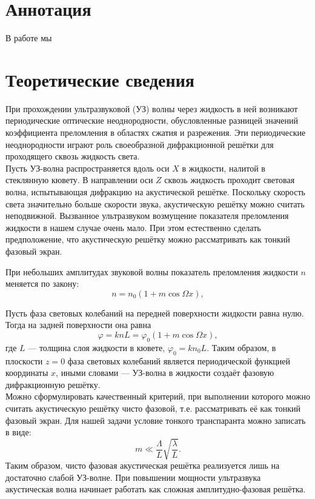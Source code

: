 \section*{Аннотация}
В работе мы 
\section*{Теоретические сведения}

\indent При прохождении ультразвуковой (УЗ) волны через жидкость в ней возникают периодические оптические неоднородности, обусловленные разницей значений коэффициента преломления в областях сжатия и разрежения. Эти периодические неоднородности играют роль своеобразной дифракционной решётки для проходящего сквозь жидкость света.\\

\indent
Пусть УЗ-волна распространяется вдоль оси $X$ в жидкости, налитой в стеклянную кювету. В направлении оси $Z$ сквозь жидкость проходит световая волна, испытывающая дифракцию на акустической решётке. Поскольку скорость света значительно больше скорости звука, акустическую решётку можно считать неподвижной. Вызванное ультразвуком возмущение показателя преломления жидкости в нашем случае очень мало. При этом естественно сделать предположение, что акустическую решётку можно рассматривать как тонкий фазовый экран.

При небольших амплитудах звуковой волны показатель преломления жидкости $n$ меняется по закону:
\begin{equation}
n = n_0(1 + m \cos\Omega x),
\end{equation}

\indent
Пусть фаза световых колебаний на передней поверхности жидкости равна нулю. Тогда на задней поверхности она равна
$$
\varphi = knL = \varphi_0(1 + m\cos\Omega x),
$$
где $L$ — толщина слоя жидкости в кювете, $\varphi_0=kn_0L$. Таким образом, в плоскости $z=0$ фаза световых колебаний является периодической функцией координаты $x$, иными словами — УЗ-волна в жидкости создаёт фазовую дифракционную решётку.\\

\indent
Можно сформулировать качественный критерий, при выполнении которого можно считать акустическую решётку чисто фазовой, т.е. рассматривать её как тонкий фазовый экран. Для нашей задачи условие тонкого транспаранта можно записать в виде:
$$
m \ll \frac{\Lambda}{L} \sqrt{\frac{\lambda}{L}}.
$$
\indent
Таким образом, чисто фазовая акустическая решётка реализуется лишь на достаточно слабой УЗ-волне. При повышении мощности ультразвука акустическая волна начинает работать как сложная амплитудно-фазовая решётка.\\

